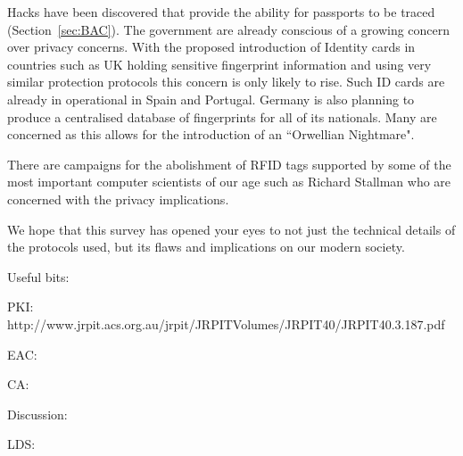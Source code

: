 \documentclass[12pt]{article}
\begin{document}
Hacks have been discovered that provide the ability for passports to be traced (Section~\ref{sec:BAC}). The government are already conscious of a growing concern over privacy concerns. With the proposed introduction of Identity cards in countries such as UK \cite{JRC:2008ws} holding sensitive fingerprint information and using very similar protection protocols this concern is only likely to rise. Such ID cards are already in operational in Spain and Portugal. Germany is also planning to produce a centralised database of fingerprints for all of its nationals. Many are concerned as this allows for the introduction of an ``Orwellian Nightmare".

There are campaigns for the abolishment of RFID tags supported by some of the most important computer scientists of our age such as Richard Stallman who are concerned with the privacy implications.

We hope that this survey has opened your eyes to not just the technical details of the protocols used, but its flaws and implications on our modern society.
\cleardoublepage


 
\newpage
Useful bits:

PKI:
http://www.jrpit.acs.org.au/jrpit/JRPITVolumes/JRPIT40/JRPIT40.3.187.pdf

EAC:
{\color{red}{
Maybe try make an implementation of a simple PKI with python?

For comparing v1 v2 etc:
http://eprint.iacr.org/2010/103.pdf

For overview of PKI authentication method
http://www.cryptomathic.com/media/12100/cryptomathic\%20cvca-dvca\%20product\%20sheet.pdf 

Paper with EAC description, CA and TA, and vulnerabilities!
http://www.springerlink.com/content/n478131u3xv35062/fulltext.pdf 

Diagrams
http://www.cryptomathic.com/media/12100/cryptomathic\%20cvca-dvca\%20product\%20sheet.pdf
http://www.secunet.com/fileadmin/user\_upload/Download/Printmaterial/Factsheets/englisch/sn\_eID-PKI-Suite\_FS\_E.pdf	
http://www.jrpit.acs.org.au/jrpit/JRPITVolumes/JRPIT40/JRPIT40.3.187.pdf
}}


CA:
{\color{red}{http://www.informatik.tu-darmstadt.de/fileadmin/user\_upload/Group\_TRUST/PubsPDF/BPSV08.pdf
https://www.bsi.bund.de/EN/Topics/ElectrIDDocuments/SecurityMechanisms/securEAC/securCA/ca\_node.html}}

Discussion:
{\color{red}{Provides information on which countries have what on their passports/ID cards
http://ftp.jrc.es/EURdoc/JRC48622.pdf}}

LDS:
{\color{red}{Image - maybe steal the figure from: E-Passports as a Means Towards the First World-Wide Public Key Infrastructure}}
\end{document}
